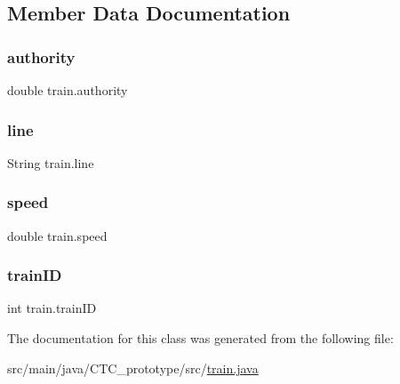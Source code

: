 \subsection{Member Data Documentation}
\mbox{\label{classtrain_ad627ddd59fd3a4e24fd20fbeae490ad6}} 
\subsubsection{\texorpdfstring{authority}{authority}}
{\footnotesize\ttfamily double train.\+authority\hspace{0.3cm}{\ttfamily [private]}}

\mbox{\label{classtrain_a0c5c46d048165fc94a8c259b953ca844}} 
\subsubsection{\texorpdfstring{line}{line}}
{\footnotesize\ttfamily String train.\+line\hspace{0.3cm}{\ttfamily [private]}}

\mbox{\label{classtrain_aae9db61086b60cf549586993da5a29dd}} 
\subsubsection{\texorpdfstring{speed}{speed}}
{\footnotesize\ttfamily double train.\+speed\hspace{0.3cm}{\ttfamily [private]}}

\mbox{\label{classtrain_afd48feba85a8c5bce2fcab13f8e5f709}} 
\subsubsection{\texorpdfstring{train\+ID}{trainID}}
{\footnotesize\ttfamily int train.\+train\+ID\hspace{0.3cm}{\ttfamily [private]}}



The documentation for this class was generated from the following file\+:\begin{DoxyCompactItemize}
\item 
src/main/java/\+C\+T\+C\+\_\+prototype/src/\hyperlink{train_8java}{train.\+java}\end{DoxyCompactItemize}
